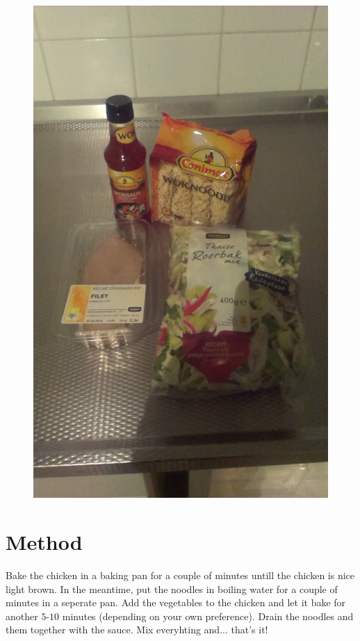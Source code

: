\documentclass[a4paper,12pt]{report}
\begin{document}
\begin{figure}[h]
\begin{minipage}{0.4\textwidth}
	\includegraphics[scale=0.09]{Images/noodles_ingredients.jpg}
\end{minipage}
\end{figure}


\section*{Method}
Bake the chicken in a baking pan for a couple of minutes untill the chicken is nice light brown. In the meantime, put the noodles in boiling water for a couple of minutes in a seperate pan. 
Add the vegetables to the chicken and let it bake for another $5$-$10$ minutes (depending on your own preference). Drain the noodles and them together with the sauce. Mix everyhting and... that's it!
\end{document}
